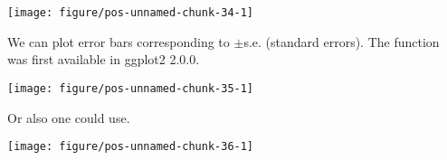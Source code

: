 \documentclass[paper=a4,10pt,div=17,headsepline,BCOR=12mm,twoside,open=right]{scrbook}\usepackage{knitr}
\begin{document}
\begin{knitrout}\footnotesize
{}\color{fgcolor}\begin{kframe}
\begin{alltt}
 \hlopt{+} \hlstd{(} \hlstd{=} \hlstd{,}
                    \hlstd{=}\hlstd{,} \hlstd{=}\hlstd{,} \hlstd{=}\hlstd{)}
\end{alltt}
\end{kframe}

{\centering \texttt{[image: figure/pos-unnamed-chunk-34-1]} 

}



\end{knitrout}

We can plot error bars corresponding to $\pm$s.e. (standard errors). The function  was first available in ggplot2 2.0.0.

\begin{knitrout}\footnotesize
{}\color{fgcolor}\begin{kframe}
\begin{alltt}
 \hlopt{+} \hlstd{(} \hlstd{=} \hlstd{,}
                    \hlstd{=}\hlstd{,} \hlstd{=}\hlstd{,} \hlstd{=}\hlstd{)}
\end{alltt}
\end{kframe}

{\centering \texttt{[image: figure/pos-unnamed-chunk-35-1]} 

}



\end{knitrout}

Or also one could use.

\begin{knitrout}\footnotesize
{}\color{fgcolor}\begin{kframe}
\begin{alltt}
 \hlopt{+} \hlstd{(} \hlstd{=} \hlstd{,}  \hlstd{=} \hlstd{(} \hlstd{=} \hlstd{),}
                    \hlstd{=}\hlstd{,} \hlstd{=}\hlstd{,} \hlstd{=}\hlstd{)}
\end{alltt}
\end{kframe}

{\centering \texttt{[image: figure/pos-unnamed-chunk-36-1]} 

}



\end{knitrout}
\end{document}
